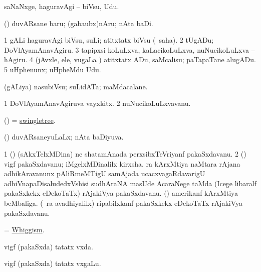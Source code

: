 \bentry
{} 
\gl{\sakirx}
\expl{}
\bmng
saNaNxge, haguravAgi -- biVsu, Udu. 
\emng

\noindent 
\gl{\akirx}
\expl{}
\bmng
(\birx) duvARsane baru; (gabaubx)nAru; nAta baDi. 
\emng
\eentry

\bentry
{} 
\gl{\akirx}
\expl{}
\bmng
\bnum
\num{1} gALi haguravAgi biVsu, suLi; atitxtatx biVsu (\sakirx\ saha). 
\num{2} tUgADu; DoVlAyamAnavAgiru. 
\num{3} tapipxsi koLuLxva, kaLacikoLuLxva, nuNucikoLuLxva -- hAgiru. 
\num{4} (jAvxle, ele, \mo vugaLa \vi) atitxtatx ADu, saMcalisu; paTapaTane alugADu. 
\num{5} uHphenunx; uHpheMdu Udu. 
\enum
\emng
\eentry

\bentry
{} 
\gl{\nA}
\expl{}
\bmng
(gALiya) nasubiVsu; suLidATa; maMdacalane. 
\emng
\eentry

\bentry
{} 
\gl{\nA}
\expl{}
\bmng
\bnum
\num{1} DoVlAyamAnavAgiruva vayxkitx. 
\num{2} nuNucikoLuLxvavanu. 
\enum
\emng
\eentry

\bentry
{} 
\gl{\nA}
\expl{}
\bmng
(\ame) = \hyperref{kandict_s.pdf}{S}{swingletree}{swingletree}. 
\emng
\eentry

\bentry
{} 
\gl{\gu}
\bmng
(\AmA) duvARsaneyuLaLx; nAta baDiyuva. 
\emng
\eentry

\bentry
{} 
\gl{\nA}
\expl{}
\bmng
\bnum
\num{1} (\ca) (sAkxTelxMDina) ne shatamAnada perxsibxTeVriyanf pakaSxdavanu. 
\num{2} (\rAshA) vigf pakaSxdavanu; iMgelxMDinalilx kirxsha. ra kArxMtiya naMtara rAjana adhikAravanunx pAliRmeMTigU samAjada ucacxvagaRdavarigU adhiVnapaDisaludedxVshisi sudhAraNA masUde AcaraNege taMda (Icege libaralf pakaSxkekx eDekoTaTx) rAjakiVya pakaSxdavanu. 
 (\ame) 
\banum
{} amerikanf kArxMtiya beMbaliga. 
 (--ra avadhiyalilx) ripabilxkanf pakaSxkekx eDekoTaTx rAjakiVya pakaSxdavanu. 
\eanum
\numie
\enum
\emng
\eentry

\bentry
{} 
\gl{\nA}
\expl{}
\bmng
= \hyperlink{Whiggism}{Whiggism}. 
\emng
\eentry

\bentry
{} 
\gl{\gu}
\expl{}
\bmng
vigf (pakaSxda) tatatx vxda. 
\emng
\eentry

\bentry
{} 
\gl{\nA}
\expl{}
\bmng
vigf (pakaSxda) tatatx vxgaLu. 
\emng
\eentry

